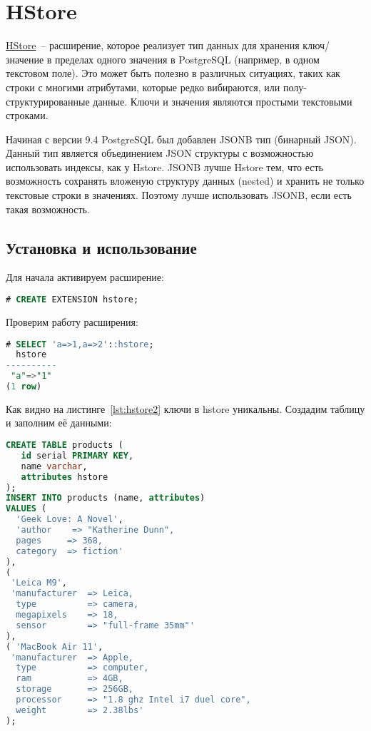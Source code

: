 \section{HStore}

\href{https://www.postgresql.org/docs/current/static/hstore.html}{HStore}~-- расширение, которое реализует тип данных для хранения ключ/значение в пределах одного значения в PostgreSQL (например, в одном текстовом поле). Это может быть полезно в различных ситуациях, таких как строки с многими атрибутами, которые редко вибираются, или полу-структурированные данные. Ключи и значения являются простыми текстовыми строками.

Начиная с версии 9.4 PostgreSQL был добавлен JSONB тип (бинарный JSON). Данный тип является объединением JSON структуры с возможностью использовать индексы, как у Hstore. JSONB лучше Hstore тем, что есть возможность сохранять вложеную структуру данных (nested) и хранить не только текстовые строки в значениях. Поэтому лучше использовать JSONB, если есть такая возможность.

\subsection{Установка и использование}

Для начала активируем расширение:

\begin{lstlisting}[language=SQL,label=lst:hstore1,caption=Активация hstore]
# CREATE EXTENSION hstore;
\end{lstlisting}

Проверим работу расширения:

\begin{lstlisting}[language=SQL,label=lst:hstore2,caption=Проверка hstore]
# SELECT 'a=>1,a=>2'::hstore;
  hstore
----------
 "a"=>"1"
(1 row)
\end{lstlisting}

Как видно на листинге~\ref{lst:hstore2} ключи в hstore уникальны. Создадим таблицу и заполним её данными:

\begin{lstlisting}[language=SQL,label=lst:hstore3,caption=Проверка hstore]
CREATE TABLE products (
   id serial PRIMARY KEY,
   name varchar,
   attributes hstore
);
INSERT INTO products (name, attributes)
VALUES (
  'Geek Love: A Novel',
  'author    => "Katherine Dunn",
  pages     => 368,
  category  => fiction'
),
(
 'Leica M9',
 'manufacturer  => Leica,
  type          => camera,
  megapixels    => 18,
  sensor        => "full-frame 35mm"'
),
( 'MacBook Air 11',
 'manufacturer  => Apple,
  type          => computer,
  ram           => 4GB,
  storage       => 256GB,
  processor     => "1.8 ghz Intel i7 duel core",
  weight        => 2.38lbs'
);
\end{lstlisting}

